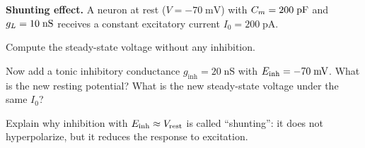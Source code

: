 \begin{exercises}
  \item \textbf{Shunting effect.}
  A neuron at rest ($V = -70\;\text{mV}$) with $C_m = 200\;\text{pF}$ and $g_L = 10\;\text{nS}$ receives a constant excitatory current $I_0 = 200\;\text{pA}$.
  \begin{parts}
    \item Compute the steady-state voltage without any inhibition.
    \item Now add a tonic inhibitory conductance $g_{\text{inh}} = 20\;\text{nS}$ with $E_{\mathrm{\text{inh}}} = -70\;\text{mV}$. What is the new resting potential? What is the new steady-state voltage under the same $I_0$?
    \item Explain why inhibition with $E_{\mathrm{\text{inh}}} \approx V_{\text{rest}}$ is called ``shunting'': it does not hyperpolarize, but it reduces the response to excitation.
  \end{parts}
\end{exercises}
